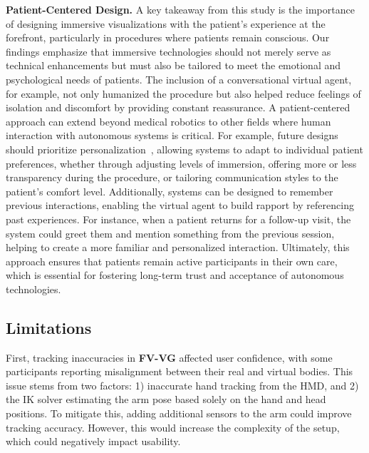\textbf{Patient-Centered Design.}
A key takeaway from this study is the importance of designing immersive visualizations with the patient’s experience at the forefront, particularly in procedures where patients remain conscious. Our findings emphasize that immersive technologies should not merely serve as technical enhancements but must also be tailored to meet the emotional and psychological needs of patients. The inclusion of a conversational virtual agent, for example, not only humanized the procedure but also helped reduce feelings of isolation and discomfort by providing constant reassurance.
A patient-centered approach can extend beyond medical robotics to other fields where human interaction with autonomous systems is critical. For example, future designs should prioritize personalization~\cite{athanasiou2014towards}, allowing systems to adapt to individual patient preferences, whether through adjusting levels of immersion, offering more or less transparency during the procedure, or tailoring communication styles to the patient’s comfort level. Additionally, systems can be designed to remember previous interactions, enabling the virtual agent to build rapport by referencing past experiences. For instance, when a patient returns for a follow-up visit, the system could greet them and mention something from the previous session, helping to create a more familiar and personalized interaction. Ultimately, this approach ensures that patients remain active participants in their own care, which is essential for fostering long-term trust and acceptance of autonomous technologies.

\subsection{Limitations}

First, tracking inaccuracies in \textbf{FV-VG} affected user confidence, with some participants reporting misalignment between their real and virtual bodies. This issue stems from two factors: 1) inaccurate hand tracking from the HMD, and 2) the IK solver estimating the arm pose based solely on the hand and head positions. To mitigate this, adding additional sensors to the arm could improve tracking accuracy. However, this would increase the complexity of the setup, which could negatively impact usability. 

